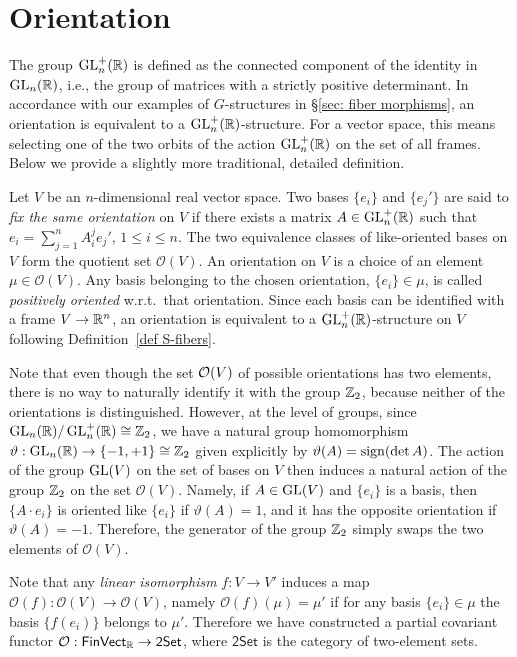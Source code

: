 \section{Orientation}

The group $\operatorname{GL}^+_n(\mathbb{R} )$ is defined as the connected component of the identity in $\operatorname{GL}_n(\mathbb{R} )$, i.e., the group of matrices with a strictly positive determinant. In accordance with our examples of $G$-structures in \S\ref{sec: fiber morphisms}, an orientation is equivalent to a $\operatorname{GL}_n^+(\mathbb{R})$-structure. For a vector space, this means selecting one of the two orbits of the action $\operatorname{GL}_n^+(\mathbb{R})$ on the set of all frames. Below we provide a slightly more traditional, detailed definition.

\begin{defn}
    Let $V$ be an $n$-dimensional real vector space. Two bases $\{e_i\}$ and $\{e_j'\}$ are said to \emph{fix the same orientation} on $V$ if there exists a matrix $A\in\operatorname{GL}^+_n(\mathbb{R} )$ such that $e_i=\sum_{j=1}^n A_i^j e_j'$, $1\leq i\leq n$. The two equivalence classes of like-oriented bases on $V$ form the quotient set $\mathcal{O}(V)$. An orientation on $V$ is a choice of an element $\mu\in\mathcal{O}(V)$. Any basis belonging to the chosen orientation, $\{e_i\}\in\mu$, is called \emph{positively oriented} w.r.t.\ that orientation. Since each basis can be identified with a frame $V\to \mathbb{R}^n$, an orientation is equivalent to a $\operatorname{GL}_n^+(\mathbb{R})$-structure on $V$ following Definition~\ref{def S-fibers}.
\end{defn}

Note that even though the set $\mathcal{O}(V)$ of possible orientations has two elements, there is no way to naturally identify it with the group $\mathbb{Z}_2$, because neither of the orientations is distinguished. However, at the level of groups, since $\operatorname{GL}_n(\mathbb{R} )\slash\operatorname{GL}^+_n(\mathbb{R} )\cong\mathbb{Z}_2$, we have a natural group homomorphism $\vartheta:\operatorname{GL}_n(\mathbb{R} )\to \{-1,+1\}\cong \mathbb{Z}_2$ given explicitly by $\vartheta(A)=\operatorname{sign} (\det A)$. The action of the group $\operatorname{GL}(V)$ on the set of bases on $V$ then induces a natural action of the group $\mathbb{Z}_2$ on the set $\mathcal{O}(V)$. Namely, if $A\in\operatorname{GL}(V)$ and $\{e_i\}$ is a basis, then $\{A\cdot e_i\}$ is oriented like $\{e_i\}$ if $\vartheta(A)=1$, and it has the opposite orientation if $\vartheta(A)=-1$. Therefore, the generator of the group $\mathbb{Z}_2$ simply swaps the two elements of $\mathcal{O}(V)$.

Note that any \emph{linear isomorphism} $f:V\to V'$ induces a map $\mathcal{O}(f):\mathcal{O}(V)\to\mathcal{O}(V)$, namely $\mathcal{O}(f)(\mu)=\mu'$ if for any basis $\{e_i\}\in\mu$ the basis $\{f(e_i)\}$ belongs to $\mu'$. Therefore we have constructed a partial covariant functor $\mathcal{O}:\mathsf{FinVect}_{\mathbb{R}} \to\mathsf{2Set}$, where $\mathsf{2Set}$ is the category of two-element sets.

